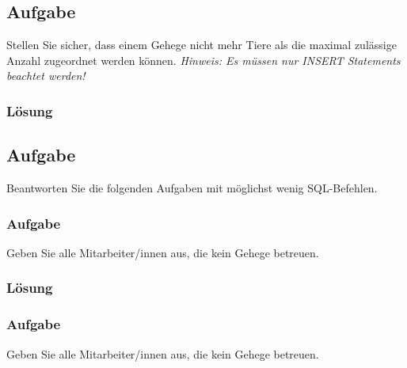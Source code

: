\subsection{Aufgabe}
\label{subsec:uebung_01.aufgabe_09}
Stellen Sie sicher, dass einem Gehege nicht mehr Tiere als die maximal zulässige Anzahl zugeordnet werden können.
\textit{Hinweis: Es müssen nur INSERT Statements beachtet werden!}

\subsubsection*{Lösung}
\label{subsubsec:uebung_01.aufgabe_9.loesung}


\subsection{Aufgabe}
\label{subsec:uebung_01.aufgabe_10}
Beantworten Sie die folgenden Aufgaben mit möglichst wenig SQL-Befehlen.

\subsubsection{Aufgabe}
\label{subsec:uebung_01.aufgabe_10a}
Geben Sie alle Mitarbeiter/innen aus, die kein Gehege betreuen.

\subsubsection*{Lösung}
\label{subsubsec:uebung_01.aufgabe_10a.loesung}

\subsubsection{Aufgabe}
\label{subsec:uebung_01.aufgabe_10b}
Geben Sie alle Mitarbeiter/innen aus, die kein Gehege betreuen.

